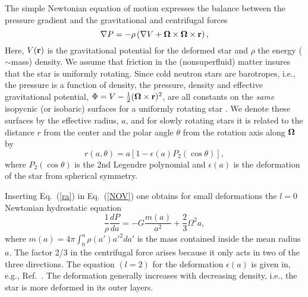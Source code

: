 \begin{multicols}{2}
The simple Newtonian equation of
motion expresses the balance between the pressure gradient and 
the gravitational and centrifugal forces
\begin{equation}
   \nabla P = -\rho\left( \nabla V +
        {\bf \Omega}\times{\bf \Omega}\times{\bf r} \right),
   \label{NOV}
\end{equation}
Here, $V({\bf r})$ is the gravitational potential for the deformed
star and $\rho$ the energy ($\sim$mass) density.  We assume that friction in the 
(nonsuperfluid) matter insures
that the star is uniformly rotating.  Since cold neutron stars are
barotropes, i.e., the pressure is a function of density,
the pressure, density and effective gravitational potential, 
$\Phi=V-\frac{1}{2}({\bf \Omega}\times{\bf r})^2$, are all
constants on the {\it same} isopycnic (or isobaric) surfaces
for a uniformly rotating star \cite{Hartle}.
We denote these surfaces by the effective radius, $a$, and
for slowly rotating stars it is related to the distance $r$ from the
center and the polar angle $\theta$ from the rotation axis along
${\bf\Omega}$ by \cite{Hartle}
\begin{equation}
   r(a,\theta) = a\left[ 1-\epsilon(a) P_2(\cos\theta) \right],
   \label{ra}
\end{equation}
where $P_2(\cos\theta)$ is the 2nd Legendre polynomial and
$\epsilon(a)$ is the deformation of the star from spherical symmetry.

Inserting Eq.\ (\ref{ra}) in Eq.\ (\ref{NOV}) 
one obtains for small deformations 
\cite{Hartle} the $l=0$ Newtonian hydrostatic equation
\begin{equation}
  \frac{1}{\rho}\frac{dP}{da} = -G\frac{m(a)}{a^2} + \frac{2}{3}\Omega^2 a,
  \label{Pa} 
\end{equation}
where $m(a)=4\pi\int^a_0\rho(a')a'^2da'$ is the mass
contained inside the mean radius $a$.
The factor 2/3 in the centrifugal force arises because it only acts in
two of the three directions.
The equation $(l=2)$ for the deformation $\epsilon(a)$
is given in, e.g., Ref.\ \cite{Tassoul}. 
The deformation generally increases
with decreasing density, i.e., the star is more deformed in its outer layers.


\end{multicols}
